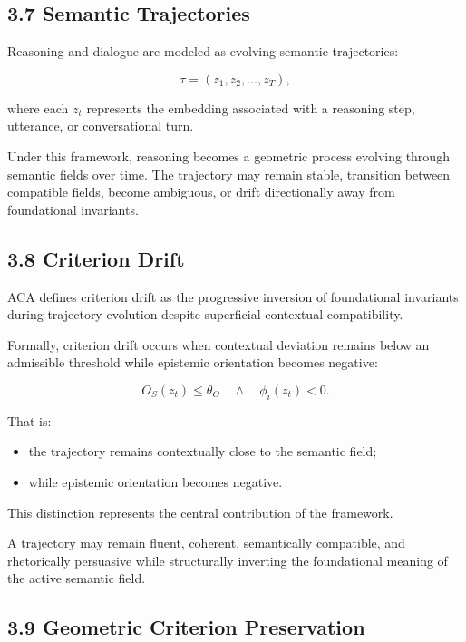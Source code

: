 \documentclass[11pt]{article}
\begin{document}
\subsection{3.7 Semantic Trajectories}

Reasoning and dialogue are modeled as evolving semantic trajectories:

$$
\tau=(z_1,z_2,\dots,z_T),
$$

where each $z_t$ represents the embedding associated with a reasoning step, utterance, or conversational turn.

Under this framework, reasoning becomes a geometric process evolving through semantic fields over time. The trajectory may remain stable, transition between compatible fields, become ambiguous, or drift directionally away from foundational invariants.

\subsection{3.8 Criterion Drift}

ACA defines criterion drift as the progressive inversion of foundational invariants during trajectory evolution despite superficial contextual compatibility.

Formally, criterion drift occurs when contextual deviation remains below an admissible threshold while epistemic orientation becomes negative:

$$
O_S(z_t)\leq\theta_O
\quad\wedge\quad
\phi_i(z_t)<0.
$$

That is:

\begin{itemize}
\item the trajectory remains contextually close to the semantic field;
\end{itemize}
\begin{itemize}
\item while epistemic orientation becomes negative.
\end{itemize}

This distinction represents the central contribution of the framework.

A trajectory may remain fluent, coherent, semantically compatible, and rhetorically persuasive while structurally inverting the foundational meaning of the active semantic field.

\subsection{3.9 Geometric Criterion Preservation}
\end{document}
